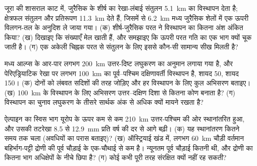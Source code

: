 \begin{exercise}[$\star\star\star$]\label{exo:b2:alpine-orogen:10}
जूरा की शासराल काट में, जुरैसिक के शीर्ष का रेखा-लंबाई संतुलन
\qty{5.1}{km} का विस्थापन देता है; क्षेत्रफल संतुलन और प्रतिरूपण \qty{11.3}{km} देते हैं, जिसमें से
\qty{6.2}{km} मध्य जुरैसिक शेलों में एक ऊपरी विलगन-तल के अनुदिश ले जाया गया।
(क) शीर्ष-जुरैसिक परत ने विस्थापन का कितना अंश अंकित किया? (ख) दिखाइए कि
संख्याएँ मेल खाती हैं, और समझाइए कि ऊपरी परत गति का एक भाग क्यों चूक जाती है। (ग) एक अकेली चिह्नक परत से
संतुलन के लिए इससे कौन-सी सामान्य सीख मिलती है?
\end{exercise}

\begin{exercise}[$\star\star\star$]\label{exo:b2:alpine-orogen:11}
मध्य आल्प्स के आर-पार लगभग \qty{200}{km} उत्तर-दिष्ट लघुकरण का
अनुमान लगाया गया है, और पेरिएड्रियाटिक रेखा पर लगभग \qty{100}{km} का पूर्व--पश्चिम दक्षिणावर्ती विस्थापन है,
शायद 50, शायद 150। (क) दोनों को लंबवत सदिशों की तरह जोड़िए और
हर विस्थापन के लिए कुल अभिसरण बताइए। (ख) \qty{100}{km} के विस्थापन के लिए अभिसरण
उत्तर--दक्षिण दिशा से कितना कोण बनाता है? (ग) विस्थापन का चुनाव
लघुकरण के तीसरे सार्थक अंक से अधिक क्यों मायने रखता है?
\end{exercise}

\begin{exercise}[$\star\star\star$]\label{exo:b2:alpine-orogen:12}
ऐल्पाइन  का स्विस भाग यूरोप के ऊपर कम से कम \qty{210}{km} उत्तर-पश्चिम की ओर
स्थानांतरित हुआ, और उसकी तटरेखा 8.5 से \qty{12.9}{mm} प्रति वर्ष की दर से आगे बढ़ी। (क) यह स्थानांतरण कितने
समय तक चला (अवधियों का परास बताइए)? (ख) ऑस्ट्रियाई खंड में, लगभग
\qty{60}{km} चौड़ी वर्तमान बहिर्भाग-पट्टी द्रोणी की पूर्व चौड़ाई के एक-चौथाई से कम है। न्यूनतम
पूर्व चौड़ाई कितनी थी, और द्रोणी का कितना भाग अधिक्षेपों के नीचे छिपा है? (ग) कोई
 कभी पूरी तरह संरक्षित क्यों नहीं रह सकती?
\end{exercise}

